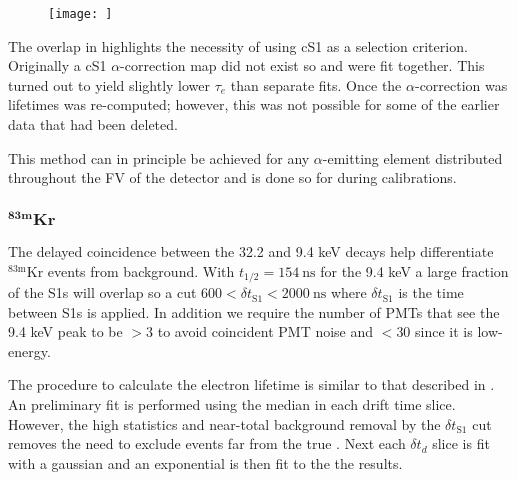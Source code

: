 \begin{figure}
\centering
\texttt{[image: ]}
\caption{}
\label{fig:electron_lifetimes_measurement_alphas_elifetime}
\end{figure}

The overlap in \stwob highlights the necessity of using cS1 as a selection criterion.  Originally a cS1 $\alpha$-correction map did not
exist so  and  were fit together.  This turned out to yield slightly lower $\tau_e$ than separate fits.  Once
the $\alpha$-correction was lifetimes was re-computed; however, this was not possible for some of the earlier data that had been
deleted.

This method can in principle be achieved for any $\alpha$-emitting element distributed throughout the FV of the detector and is done so
for  during  calibrations.


\subsubsection{$\mathbf{^{83m}Kr}$}
\label{subsubsec:electron_lifetimes_measurement_kr}
The delayed coincidence between the 32.2 and 9.4 keV decays help differentiate $\mathrm{^{83m}Kr}$ events from background.  With
$t_{1/2} = 154\ \mathrm{ns}$ for the 9.4 keV a large fraction of the S1s will overlap so a cut
$600 < \delta t_{\mathrm{S1}} < 2000\ \mathrm{ns}$
where $\delta t_{\mathrm{S1}}$ is the time between S1s is applied.  In addition we require the number of PMTs that see the 9.4 keV peak
to be $> 3$ to avoid coincident PMT noise and $< 30$ since it is low-energy.

The procedure to calculate the electron lifetime is similar to that described in
.  An preliminary fit is performed using the median \stwob in each drift time
slice.  However, the high statistics and near-total background removal by the $\delta t_{\mathrm{S1}}$ cut
removes the need to exclude events far from the true \metakr.  Next each $\delta t_d$ slice is fit with a gaussian and an exponential
is then fit to the the results.



